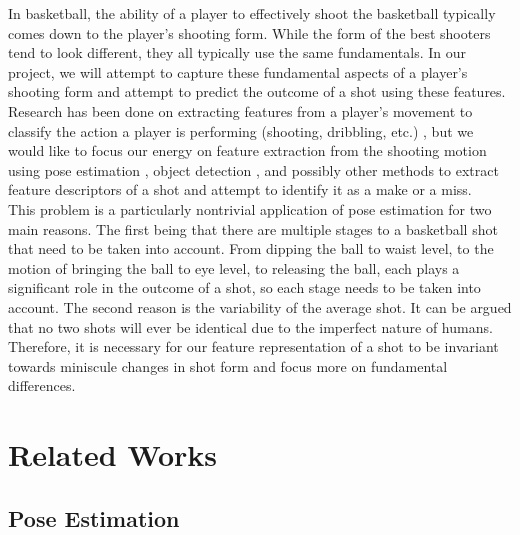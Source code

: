 \documentclass[10pt,twocolumn,letterpaper]{article}
\begin{document}
In basketball, the ability of a player to effectively shoot the basketball typically comes down to the player’s shooting form. While the form of the best shooters tend to look different, they all typically use the same fundamentals. In our project, we will attempt to capture these fundamental aspects of a player’s shooting form and attempt to predict the outcome of a shot using these features. Research has been done on extracting features from a player’s movement to classify the action a player is performing (shooting, dribbling, etc.) \cite{Basketball}, but we would like to focus our energy on feature extraction from the shooting motion using pose estimation \cite{OpenPose}, object detection \cite{YOLO}, and possibly other methods to extract feature descriptors of a shot and attempt to identify it as a make or a miss.\\
\indent This problem is a particularly nontrivial application of pose estimation for two main reasons. The first being that there are multiple stages to
a basketball shot that need to be taken into account. From dipping the ball to waist level, to the motion of bringing the ball to eye level, to releasing the ball, each
plays a significant role in the outcome of a shot, so each stage needs to be taken into account. The second reason is the variability of the average shot. It can be argued that no two shots will ever be identical due to the imperfect nature of humans.
Therefore, it is necessary for our feature representation of a shot to be invariant towards miniscule changes
in shot form and focus more on fundamental differences.
\section{Related Works}
\label{sec:formatting}

\subsection{Pose Estimation}
\end{document}
